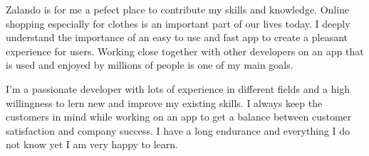 \documentclass[11pt, a4paper]{awesome-cv}
\begin{document}
\begin{cvletter}
Zalando is for me a pefect place to contribute my skills and knowledge. Online shopping especially for clothes is an important part of our lives today. I deeply understand the importance of an easy to use and fast app to create a pleasant experience for users. Working close together with other developers on an app that is used and enjoyed by millions of people is one of my main goals.

I'm a passionate developer with lots of experience in different fields and a high willingness to lern new and improve my existing skills. I always keep the customers in mind while working on an app to get a balance between customer satisfaction and company success. 
I have a long endurance and everything I do not know yet I am very happy to learn.

\end{cvletter}


\makeletterclosing
\end{document}
